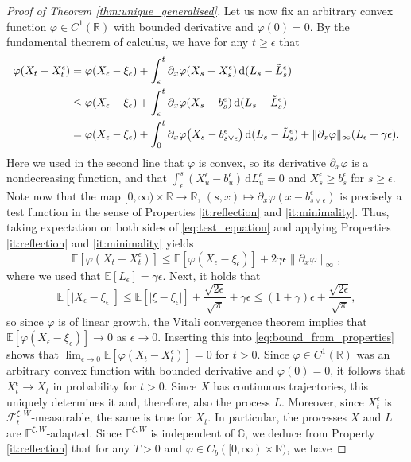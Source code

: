 \documentclass[11pt, a4paper]{article}
\theoremstyle{plain}
\theoremstyle{definition}
\theoremstyle{remark}
\numberwithin{equation}{section}
\newcommand{\ev}{\mathbb{E}}
\newcommand{\R}{\mathbb{R}}
\newcommand{\F}{\mathcal{F}}
\renewcommand{\d}{\mathrm{d}}
\newcommand{\bb}[1]{\mathbb{#1}}
\begin{document}
\begin{proof}[Proof of Theorem \ref{thm:unique_generalised}]
Let us now fix an arbitrary convex function $\varphi \in C^1(\R)$ with bounded derivative and $\varphi(0) = 0$. By the fundamental theorem of calculus, we have for any $t \geq \epsilon$ that
\begin{align} \label{eq:test_equation}
    \varphi(X_t - X^{\epsilon}_t) &= \varphi(X_{\epsilon} - \xi_{\epsilon}) + \int_{\epsilon}^t \partial_x \varphi(X_s - X^{\epsilon}_s) \, \d (L_s - \tilde{L}^{\epsilon}_s) \notag \\
    &\leq \varphi(X_{\epsilon} - \xi_{\epsilon}) + \int_{\epsilon}^t \partial_x \varphi(X_s - b^{\epsilon}_s) \, \d (L_s - \tilde{L}^{\epsilon}_s) \notag \\
    &= \varphi(X_{\epsilon} - \xi_{\epsilon}) + \int_0^t \partial_x \varphi\bigl(X_s - b^{\epsilon}_{s \lor \epsilon}\bigr) \, \d (L_s - \tilde{L}^{\epsilon}_s) + \lVert \partial_x \varphi\rVert_{\infty} (L_{\epsilon} + \gamma \epsilon).
\end{align}
Here we used in the second line that $\varphi$ is convex, so its derivative $\partial_x \varphi$ is a nondecreasing function, and that $\int_{\epsilon}^s (X^{\epsilon}_u - b^{\epsilon}_u) \, \d L^{\epsilon}_u = 0$ and $X^{\epsilon}_s \geq b^{\epsilon}_s$ for $s \geq \epsilon$. Note now that the map $[0, \infty) \times \R \to \R$, $(s, x) \mapsto \partial_x \varphi(x - b^{\epsilon}_{s \lor \epsilon})$ is precisely a test function in the sense of Properties \ref{it:reflection} and \ref{it:minimality}. Thus, taking expectation on both sides of \eqref{eq:test_equation} and applying Properties \ref{it:reflection} and \ref{it:minimality} yields
\begin{equation} \label{eq:bound_from_properties}
    \ev[\varphi(X_t - X^{\epsilon}_t)] \leq \ev[\varphi(X_{\epsilon} - \xi_{\epsilon})] + 2\gamma \epsilon \lVert \partial_x \varphi\rVert_{\infty},
\end{equation}
where we used that $\ev[L_{\epsilon}] = \gamma \epsilon$. Next, it holds that
\begin{equation*}
    \ev[\lvert X_{\epsilon} - \xi_{\epsilon}\rvert] \leq \ev[\lvert \xi - \xi_{\epsilon}\rvert] + \frac{\sqrt{2\epsilon}}{\sqrt{\pi}} + \gamma \epsilon \leq (1 + \gamma) \epsilon + \frac{\sqrt{2\epsilon}}{\sqrt{\pi}},
\end{equation*}
so since $\varphi$ is of linear growth, the Vitali convergence theorem implies that $\ev[\varphi(X_{\epsilon} - \xi_{\epsilon})] \to 0$ as $\epsilon \to 0$. Inserting this into \eqref{eq:bound_from_properties} shows that $\lim_{\epsilon \to 0} \ev[\varphi(X_t - X^{\epsilon}_t)] = 0$ for $t > 0$. Since $\varphi \in C^1(\R)$ was an arbitrary convex function with bounded derivative and $\varphi(0) = 0$, it follows that $X^{\epsilon}_t \to X_t$ in probability for $t > 0$. Since $X$ has continuous trajectories, this uniquely determines it and, therefore, also the process $L$. Moreover, since $X^{\epsilon}_t$ is $\F^{\xi, W}_t$-measurable, the same is true for $X_t$. In particular, the processes $X$ and $L$ are $\bb{F}^{\xi, W}$-adapted. Since $\bb{F}^{\xi, W}$ is independent of $\bb{G}$, we deduce from Property \ref{it:reflection} that for any $T > 0$ and $\varphi \in C_b([0, \infty) \times \R)$, we have

\end{proof}
\end{document}
